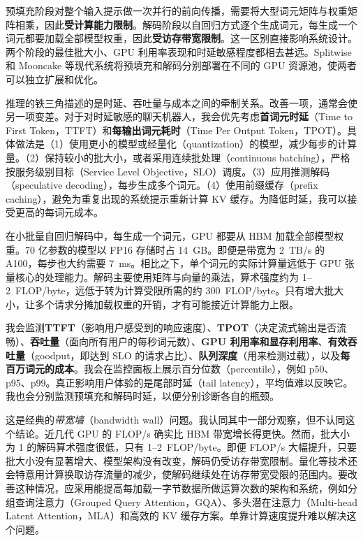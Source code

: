 \begin{interview}
预填充阶段对整个输入提示做一次并行的前向传播，需要将大型词元矩阵与权重矩阵相乘，因此\textbf{受计算能力限制}。解码阶段以自回归方式逐个生成词元，每生成一个词元都要加载全部模型权重，因此\textbf{受访存带宽限制}。这一区别直接影响系统设计。两个阶段的最佳批大小、GPU 利用率表现和时延敏感程度都相去甚远。Splitwise 和 Mooncake 等现代系统将预填充和解码分别部署在不同的 GPU 资源池，使两者可以独立扩展和优化。

推理的铁三角描述的是时延、吞吐量与成本之间的牵制关系。改善一项，通常会使另一项变差。对于对时延敏感的聊天机器人，我会优先考虑\textbf{首词元时延}（Time to First Token，TTFT）和\textbf{每输出词元耗时}（Time Per Output Token，TPOT）。具体做法是（1）使用更小的模型或经量化（quantization）的模型，减少每步的计算量。（2）保持较小的批大小，或者采用连续批处理（continuous batching），严格按服务级别目标（Service Level Objective，SLO）调度。（3）应用推测解码（speculative decoding），每步生成多个词元。（4）使用前缀缓存（prefix caching），避免为重复出现的系统提示重新计算 KV 缓存。为降低时延，我可以接受更高的每词元成本。

在小批量自回归解码中，每生成一个词元，GPU 都要从 HBM 加载全部模型权重。70 亿参数的模型以 FP16 存储时占 14~GB。即便是带宽为 2~TB/s 的 A100，每步也大约需要 7~ms。相比之下，单个词元的实际计算量远低于 GPU 张量核心的处理能力。解码主要使用矩阵与向量的乘法，算术强度约为 1–2~FLOP/byte，远低于转为计算受限所需的约 300~FLOP/byte。只有增大批大小，让多个请求分摊加载权重的开销，才有可能接近计算能力上限。

我会监测\textbf{TTFT}（影响用户感受到的响应速度）、\textbf{TPOT}（决定流式输出是否流畅）、\textbf{吞吐量}（面向所有用户的每秒词元数）、\textbf{GPU 利用率和显存利用率}、\textbf{有效吞吐量}（goodput，即达到 SLO 的请求占比）、\textbf{队列深度}（用来检测过载），以及\textbf{每百万词元的成本}。我会在监控面板上展示百分位数（percentile），例如 p50、p95、p99。真正影响用户体验的是尾部时延（tail latency），平均值难以反映它。我也会分别监测预填充和解码时延，以便分别诊断各自的瓶颈。

这是经典的\emph{带宽墙}（bandwidth wall）问题。我认同其中一部分观察，但不认同这个结论。近几代 GPU 的 FLOP/s 确实比 HBM 带宽增长得更快。然而，批大小为 1 的解码算术强度很低，只有 1–2~FLOP/byte。即便 FLOP/s 大幅提升，只要批大小没有显著增大、模型架构没有改变，解码仍受访存带宽限制。量化等技术还会特意用计算换取访存流量的减少，使解码继续处在访存带宽受限的范围内。要改善这种情况，应采用能提高每加载一字节数据所做运算次数的架构和系统，例如分组查询注意力（Grouped Query Attention，GQA）、多头潜在注意力（Multi-head Latent Attention，MLA）和高效的 KV 缓存方案。单靠计算速度提升难以解决这个问题。
\end{interview}
